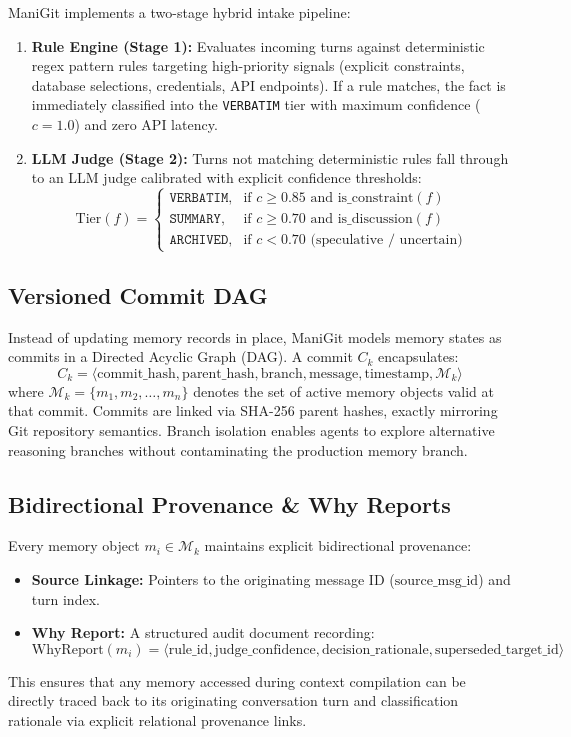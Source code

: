 ManiGit implements a two-stage hybrid intake pipeline:
\begin{enumerate}
    \item \textbf{Rule Engine (Stage 1):} Evaluates incoming turns against deterministic regex pattern rules targeting high-priority signals (explicit constraints, database selections, credentials, API endpoints). If a rule matches, the fact is immediately classified into the \texttt{VERBATIM} tier with maximum confidence ($c = 1.0$) and zero API latency.
    \item \textbf{LLM Judge (Stage 2):} Turns not matching deterministic rules fall through to an LLM judge calibrated with explicit confidence thresholds:
    $$\text{Tier}(f) = \begin{cases}
    \texttt{VERBATIM}, & \text{if } c \ge 0.85 \text{ and is\_constraint}(f) \\
    \texttt{SUMMARY},  & \text{if } c \ge 0.70 \text{ and is\_discussion}(f) \\
    \texttt{ARCHIVED}, & \text{if } c < 0.70 \text{ (speculative / uncertain)}
    \end{cases}$$
\end{enumerate}

\subsection{Versioned Commit DAG}
Instead of updating memory records in place, ManiGit models memory states as commits in a Directed Acyclic Graph (DAG). A commit $C_k$ encapsulates:
$$C_k = \langle \text{commit\_hash}, \text{parent\_hash}, \text{branch}, \text{message}, \text{timestamp}, \mathcal{M}_k \rangle$$
where $\mathcal{M}_k = \{m_1, m_2, \dots, m_n\}$ denotes the set of active memory objects valid at that commit. Commits are linked via SHA-256 parent hashes, exactly mirroring Git repository semantics. Branch isolation enables agents to explore alternative reasoning branches without contaminating the production memory branch.

\subsection{Bidirectional Provenance & Why Reports}
Every memory object $m_i \in \mathcal{M}_k$ maintains explicit bidirectional provenance:
\begin{itemize}
    \item \textbf{Source Linkage:} Pointers to the originating message ID ($\text{source\_msg\_id}$) and turn index.
    \item \textbf{Why Report:} A structured audit document recording:
    $$\text{WhyReport}(m_i) = \langle \text{rule\_id}, \text{judge\_confidence}, \text{decision\_rationale}, \text{superseded\_target\_id} \rangle$$
\end{itemize}
This ensures that any memory accessed during context compilation can be directly traced back to its originating conversation turn and classification rationale via explicit relational provenance links.

